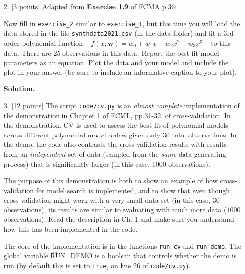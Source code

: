 \documentclass[10pt]{article}
\begin{document}
\begin{itemize}
\item[2.] [3 points]
Adapted from {\bf Exercise 1.9} of FCMA p.36:

Now fill in {\tt exercise\_2} similar to {\tt exercise\_1}, but this time you will load the data stored in the file {\tt synthdata2021.csv} (in the data folder) and fit a 3rd order polynomial function -- $f(x; \mathbf{w}) = w_0 + w_1 x + w_2 x^2 + w_3 x^3$ -- to this data. There are 25 observations in this data.
Report the best-fit model parameters as an equation. Plot the data and your model and include the plot in your answer (be sure to include an informative caption to your plot).

{\bf Solution.} 



\item[3.] [12 points]
The script {\tt code/cv.py} is an {\em almost complete} implementation of the demonstration in Chapter 1 of FCML, pp.31-32, of cross-validation. In the demonstration, CV is used to assess the best fit of polynomial models across different polynomial model orders given only 30 total observations. In the demo, the code also contrasts the cross-validation results with results from an {\em independent} set of data (sampled from the {\em same} data generating process) that is significantly larger (in this case, $1000$ observations).

The purpose of this demonstration is both to show an example of how cross-validation for model search is implemented, and to show that even though cross-validation might work with a very small data set (in this case, $30$ observations), its results are similar to evaluating with much more data ($1000$ observations). Read the description in Ch. 1 and make sure you understand how this has been implemented in the code. 

The core of the implementation is in the functions {\tt run\_cv} and {\tt run\_demo}. The global variable {\t RUN\_DEMO} is a boolean that controls whether the demo is run (by default this is set to {\tt True}, on line 26 of {\tt code/cv.py}). 


\end{itemize}
\end{document}
